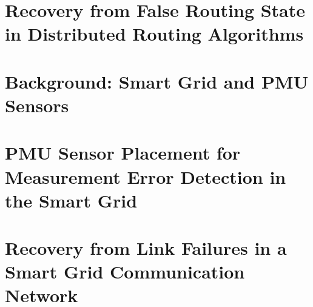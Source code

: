 \documentclass{umthesis}
\begin{document}




\chapter{Recovery from False Routing State in Distributed Routing Algorithms}


\chapter{Background: Smart Grid and PMU Sensors}



\chapter{PMU Sensor Placement for Measurement Error Detection in the Smart Grid}


\chapter{Recovery from Link Failures in a Smart Grid Communication Network}
\end{document}
